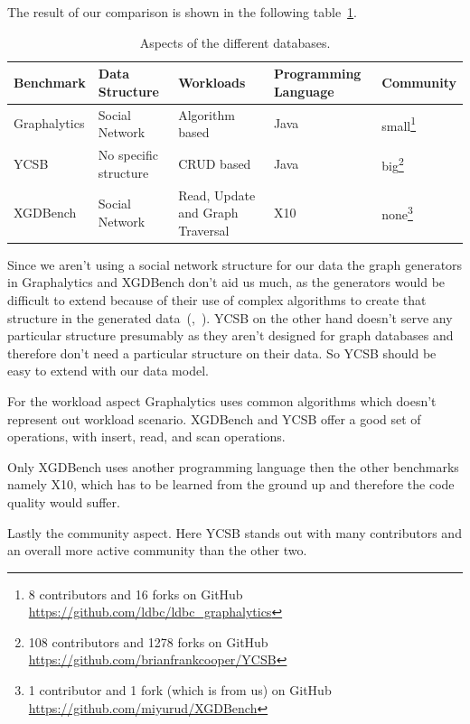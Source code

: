 The result of our comparison is shown in the following table~\ref{tab:benchmarkComparison}.

\begin{table}[!h]
  \begin{minipage}{\textwidth}
    \begin{tabularx}{\textwidth}{ | l | X | X | X | l | }
      \hline
      Benchmark & Data Structure & Workloads & Programming Language & Community \\ \hline
      Graphalytics & Social Network & Algorithm based & Java & small\footnote{8 contributors and 16 forks on GitHub \url{https://github.com/ldbc/ldbc_graphalytics}} \\ \hline
      YCSB & No specific structure & CRUD based & Java & big\footnote{108 contributors and 1278 forks on GitHub \url{https://github.com/brianfrankcooper/YCSB}} \\ \hline
      XGDBench & Social Network & Read, Update and Graph Traversal & X10 & none\footnote{1 contributor and 1 fork (which is from us) on GitHub \url{https://github.com/miyurud/XGDBench}} \\ \hline
    \end{tabularx}
  \end{minipage}
  \caption{Aspects of the different databases.}
  \label{tab:benchmarkComparison}
\end{table}

Since we aren't using a social network structure for our data the graph generators in Graphalytics and XGDBench don't aid us much,
as the generators would be difficult to extend because of their use of complex algorithms to create that structure in the generated data~(\cite{Erling2015},~\cite{Dayarathna2012}).
YCSB on the other hand doesn't serve any particular structure presumably as they aren't designed for graph databases and therefore don't need a particular structure on their data.
So YCSB should be easy to extend with our data model.

For the workload aspect Graphalytics uses common algorithms which doesn't represent out workload scenario.
XGDBench and YCSB offer a good set of operations, with insert, read, and scan operations.

Only XGDBench uses another programming language then the other benchmarks namely X10,
which has to be learned from the ground up and therefore the code quality would suffer.

Lastly the community aspect.
Here YCSB stands out with many contributors and an overall more active community than the other two.


